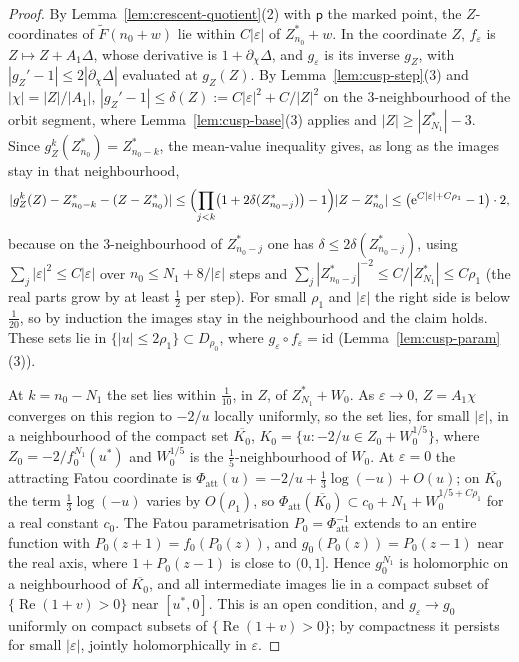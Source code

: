 \documentclass[11pt]{amsart}
\theoremstyle{definition}
\newcommand{\eee}{\mathrm{e}}
\begin{document}
\begin{proof}
By Lemma~\ref{lem:crescent-quotient}(2) with $\mathsf p$ the marked point, the
$Z$-coordinates of $\tilde F(n_0+w)$ lie within $C|\varepsilon|$ of $Z^*_{n_0}+w$.  In the
coordinate $Z$, $f_\varepsilon$ is $Z\mapsto Z+A_1\Delta$, whose derivative is
$1+\partial_\chi\Delta$, and $g_\varepsilon$ is its inverse $g_Z$, with
$|g_Z'-1|\le2|\partial_\chi\Delta|$ evaluated at $g_Z(Z)$.  By Lemma~\ref{lem:cusp-step}(3)
and $|\chi|=|Z|/|A_1|$, $|g_Z'-1|\le\delta(Z):=C|\varepsilon|^2+C/|Z|^2$ on the
$3$-neighbourhood of the orbit segment, where Lemma~\ref{lem:cusp-base}(3)
applies and $|Z|\ge|Z^*_{N_1}|-3$.  Since $g_Z^k(Z^*_{n_0})=Z^*_{n_0-k}$, the
mean-value inequality gives, as long as the images stay in that
neighbourhood,
\[
 |g_Z^k(Z)-Z^*_{n_0-k}-(Z-Z^*_{n_0})|\le\Bigl(\prod_{j<k}\bigl(1+2\delta(Z^*_{n_0-j})\bigr)-1\Bigr)|Z-Z^*_{n_0}|
 \le\bigl(\eee^{C|\varepsilon|+C\rho_1}-1\bigr)\cdot2,
\]
because on the $3$-neighbourhood of $Z^*_{n_0-j}$ one has $\delta\le2\delta(Z^*_{n_0-j})$,
using $\sum_j|\varepsilon|^2\le C|\varepsilon|$ over $n_0\le N_1+8/|\varepsilon|$ steps and
$\sum_j|Z^*_{n_0-j}|^{-2}\le C/|Z^*_{N_1}|\le C\rho_1$ (the real parts grow by at least
$\tfrac12$ per step).  For small $\rho_1$ and $|\varepsilon|$ the right side is below $\tfrac1{20}$,
so by induction the images stay in the neighbourhood and the claim holds.
These sets lie in $\{|u|\le2\rho_1\}\subset D_{\rho_0}$, where
$g_\varepsilon\circ f_\varepsilon=\mathrm{id}$ (Lemma~\ref{lem:cusp-param}(3)).

At $k=n_0-N_1$ the set lies within $\tfrac1{10}$, in $Z$, of $Z^*_{N_1}+W_0$.  As
$\varepsilon\to0$, $Z=A_1\chi$ converges on this region to $-2/u$ locally uniformly, so the
set lies, for small $|\varepsilon|$, in a neighbourhood of the compact set
$\overline{K_0}$, $K_0=\{u:-2/u\in Z_0+W_0^{1/5}\}$, where $Z_0=-2/f_0^{N_1}(u^*)$ and
$W_0^{1/5}$ is the $\tfrac15$-neighbourhood of $W_0$.  At $\varepsilon=0$ the attracting Fatou
coordinate is $\Phi_{\mathrm{att}}(u)=-2/u+\tfrac13\log(-u)+O(u)$; on $\overline{K_0}$ the term
$\tfrac13\log(-u)$ varies by $O(\rho_1)$, so
$\Phi_{\mathrm{att}}(\overline{K_0})\subset c_0+N_1+W_0^{1/5+C\rho_1}$ for a real constant $c_0$.
The Fatou parametrisation $P_0=\Phi_{\mathrm{att}}^{-1}$ extends to an entire function with
$P_0(z+1)=f_0(P_0(z))$, and $g_0(P_0(z))=P_0(z-1)$ near the real axis, where
$1+P_0(z-1)$ is close to $(0,1]$.  Hence $g_0^{N_1}$ is holomorphic on a
neighbourhood of $\overline{K_0}$, and all intermediate images lie in a compact subset
of $\{\operatorname{Re}(1+v)>0\}$ near $[u^*,0]$.  This is an open condition, and
$g_\varepsilon\to g_0$ uniformly on compact subsets of $\{\operatorname{Re}(1+v)>0\}$; by
compactness it persists for small $|\varepsilon|$, jointly holomorphically in $\varepsilon$.
\end{proof}
\end{document}
